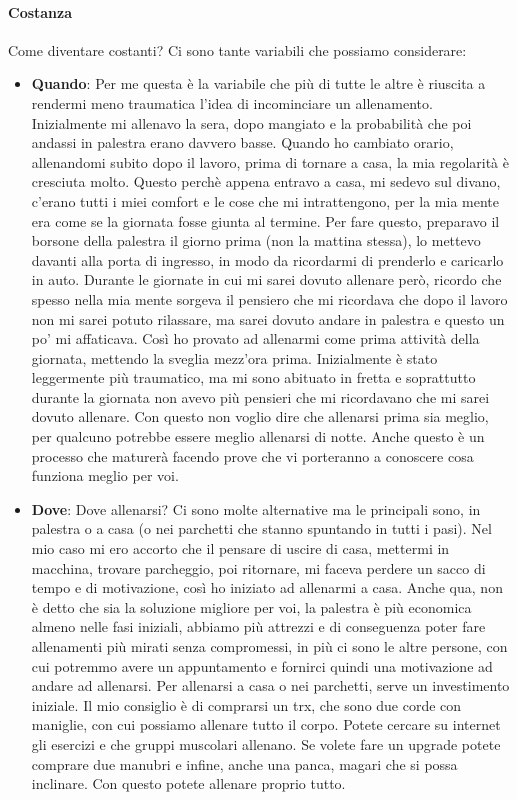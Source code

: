 \documentclass[12pt]{book} %
\begin{document}
\paragraph{Costanza}

Come diventare costanti?
Ci sono tante variabili che possiamo considerare:

\begin{itemize}
\item \textbf{Quando}: Per me questa è la variabile che più di tutte le altre è riuscita a rendermi meno traumatica l'idea di incominciare un allenamento. Inizialmente mi allenavo la sera, dopo mangiato e la probabilità che poi andassi in palestra erano davvero basse. Quando ho cambiato orario, allenandomi subito dopo il lavoro, prima di tornare a casa, la mia regolarità è cresciuta molto. Questo perchè appena entravo a casa, mi sedevo sul divano, c'erano tutti i miei comfort e le cose che mi intrattengono, per la mia mente era come se la giornata fosse giunta al termine.
Per fare questo, preparavo il borsone della palestra il giorno prima (non la mattina stessa), lo mettevo davanti alla porta di ingresso, in modo da ricordarmi di prenderlo e caricarlo in auto. 
Durante le giornate in cui mi sarei dovuto allenare però, ricordo che spesso nella mia mente sorgeva il pensiero che mi ricordava che dopo il lavoro non mi sarei potuto rilassare, ma sarei dovuto andare in palestra e questo un po' mi affaticava. Così ho provato ad allenarmi come prima attività della giornata, mettendo la sveglia mezz'ora prima. Inizialmente è stato leggermente più traumatico, ma mi sono abituato in fretta e soprattutto durante la giornata non avevo più pensieri che mi ricordavano che mi sarei dovuto allenare. Con questo non voglio dire che allenarsi prima sia meglio, per qualcuno potrebbe essere meglio allenarsi di notte. Anche questo è un processo che maturerà facendo prove che vi porteranno a conoscere cosa funziona meglio per voi. 

\item \textbf{Dove}: Dove allenarsi? Ci sono molte alternative ma le principali sono, in palestra o a casa (o nei parchetti che stanno spuntando in tutti i pasi). Nel mio caso mi ero accorto che il pensare di uscire di casa, mettermi in macchina, trovare parcheggio, poi ritornare, mi faceva perdere un sacco di tempo e di motivazione, così ho iniziato ad allenarmi a casa. Anche qua, non è detto che sia la soluzione migliore per voi, la palestra è più economica almeno nelle fasi iniziali, abbiamo più attrezzi e di conseguenza poter fare allenamenti più mirati senza compromessi, in più ci sono le altre persone, con cui potremmo avere un appuntamento e fornirci quindi una motivazione ad andare ad allenarsi.
Per allenarsi a casa o nei parchetti, serve un investimento iniziale. Il mio consiglio è di comprarsi un trx, che sono due corde con maniglie, con cui possiamo allenare tutto il corpo. Potete cercare su internet gli esercizi e che gruppi muscolari allenano. Se volete fare un upgrade potete comprare due manubri e infine, anche una panca, magari che si possa inclinare. Con questo potete allenare proprio tutto.


\end{itemize}
\end{document}

